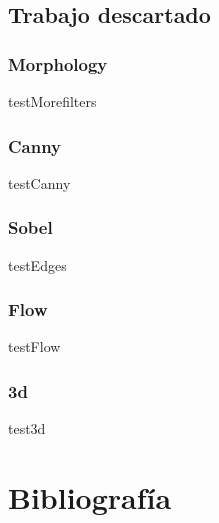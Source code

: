 \documentclass[a4paper,12pt]{article}
\begin{document}
\subsection{Trabajo descartado}
\subsubsection{Morphology}
\label{sec:morf}
testMorefilters
\subsubsection{Canny}
testCanny
\subsubsection{Sobel}
testEdges
\subsubsection{Flow}
testFlow
\subsubsection{3d}
test3d
\section{Bibliografía}



\clearpage
\end{document}
